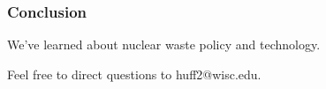 
\begin{frame}[ctb!]
  \frametitle{Conclusion}
\footnotesize{
  We've learned about nuclear waste policy and technology.
  
  Feel free to direct questions to huff2@wisc.edu.
}
\end{frame}
